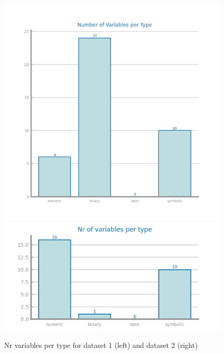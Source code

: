 \documentclass[10pt]{extarticle}
\begin{document}
\begin{figure}[H]
  \includegraphics[scale=0.70]{images/dataset1/data_profiling/CovidPos_variable_types.png}
  \centering\includegraphics[scale=0.7]{images/dataset2/data_profiling/Credit_Score_variable_types.png}
\caption{Nr variables per type for dataset 1 (left) and dataset 2 (right)}
\end{figure}
\end{document}
